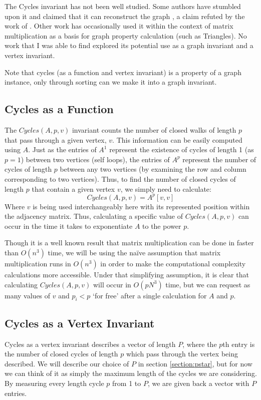 The Cycles invariant has not been well studied. 
Some authors have stumbled upon it and claimed that it can reconstruct the graph \cite{cornell}, a claim refuted by the work of \cite{eigenspaces}.
Other work has occasionally used it within the context of matrix multiplication as a basis for graph property calculation (such as Triangles).
No work that I was able to find explored its potential use as a graph invariant and a vertex invariant. 

Note that cycles (as a function and vertex invariant) is a property of a graph instance, only through sorting can we make it into a graph invariant.


\subsection{Cycles as a Function}

The $Cycles(A, p, v)$ invariant counts the number of closed walks of length $p$ that pass through a given vertex, $v$. 
This information can be easily computed using $A$. 
Just as the entries of $A^1$ represent the existence of cycles of length 1 (as $p = 1$) between two vertices (self loops), the entries of $A^p$ represent the number of cycles of length $p$ between any two vertices (by examining the row and column corresponding to two vertices).
Thus, to find the number of closed cycles of length $p$ that contain a given vertex $v$, we simply need to calculate: 
$$Cycles(A, p, v) = A^p[v, v]$$
Where $v$ is being used interchangeably here with its represented position within the adjacency matrix. 
Thus, calculating a specific value of $Cycles(A, p, v)$ can occur in the time it takes to exponentiate $A$ to the power $p$.

Though it is a well known result that matrix multiplication can be done in faster than $O(n^3)$ time, we will be using the na\"{i}ve assumption that matrix multiplication runs in $O(n^3)$ in order to make the computational complexity calculations more accessible.  
Under that simplifying assumption, it is clear that calculating $Cycles(A, p, v)$ will occur in $O(p N^3)$ time, but we can request as many values of $v$ and $p_i < p$ `for free' after a single calculation for $A$ and $p$.


\subsection{Cycles as a Vertex Invariant}

Cycles as a vertex invariant describes a vector of length $P$, where the $p$th entry is the number of closed cycles of length $p$ which pass through the vertex being described.
We will describe our choice of $P$ in section \ref{section:pstar}, but for now we can think of it as simply the maximum length of the cycles we are considering.
By measuring every length cycle $p$ from 1 to $P$, we are given back a vector with $P$ entries.


